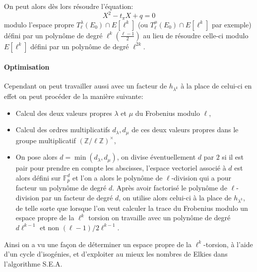 \documentclass[10pt,a4paper]{book}
\theoremstyle{plain}
\theoremstyle{definition}
\theoremstyle{definition}
\theoremstyle{definition}
\theoremstyle{definition}
\theoremstyle{remark}
\theoremstyle{remark}
\begin{document}
On peut alors dès lors résoudre l'équation:
\begin{equation*}
X^2-t_{\pi}X+q=0
\end{equation*}
modulo l'espace propre $T_{\ell}^{\lambda}(E_0) \cap E[\ell^k]$ (ou $T_{\ell}^{\mu}(E_0) \cap E[\ell^k]$ par exemple) défini par un polynôme de degré $\ell^k  (\frac{\ell-1}{2})$ au lieu de résoudre celle-ci modulo $E[\ell^k]$ défini par un polynôme de degré $\ell^{2k}$.

\paragraph{Optimisation}
Cependant on peut travailler aussi avec un facteur de $h_{\lambda^k}$ à la place de celui-ci en effet on peut procéder de la manière suivante:
\begin{itemize}
\item Calcul des deux valeurs propres $\lambda$ et $\mu$ du Frobenius modulo $\ell$,
\item Calcul des ordres multiplicatifs $d_{\lambda},d_{\mu}$ de ces deux valeurs propres dans le groupe multiplicatif $(\mathbb{Z}/\ell \mathbb{Z})^{\times}$,
\item On pose alors $d=\min(d_{\lambda},d_{\mu})$, on divise éventuellement $d$ par $2$ si il est pair pour prendre en compte les abscisses, l'espace vectoriel associé à $d$ est alors défini sur $\mathbb{F}_p^{d}$ et l'on a alors le polynôme de $\ell$-division qui a pour facteur un polynôme de degré $d$. Après avoir factorisé le polynôme de $\ell$-division par un facteur de degré $d$, on utilise alors celui-ci à la place de $h_{\lambda^{k}}$, de telle sorte que lorsque l'on veut calculer la trace du Frobenius modulo un espace propre de la $\ell^k$ torsion on travaille avec un polynôme de degré $d \ell^{k-1}$ et non $(\ell -1)/2 \ell^{k-1}$.
\end{itemize}

Ainsi on a vu une façon de déterminer un espace propre de la $\ell^k$-torsion, à l'aide d'un cycle d'isogénies, et d'exploiter au mieux les nombres de Elkies dans l'algorithme S.E.A. 

\end{document}

